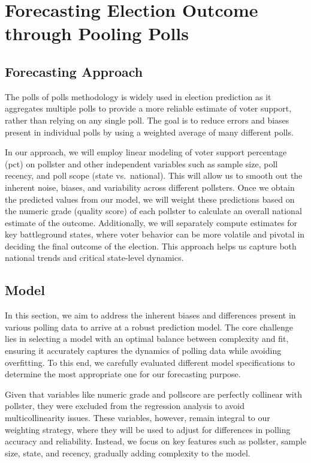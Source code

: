 \documentclass[
  letterpaper,
  DIV=11,
  numbers=noendperiod]{scrartcl}
\begin{document}
\hypertarget{sec-model}{%
\section{Forecasting Election Outcome through Pooling
Polls}\label{sec-model}}

\hypertarget{forecasting-approach}{%
\subsection{Forecasting Approach}\label{forecasting-approach}}

The polls of polls methodology is widely used in election prediction as
it aggregates multiple polls to provide a more reliable estimate of
voter support, rather than relying on any single poll. The goal is to
reduce errors and biases present in individual polls by using a weighted
average of many different polls.

In our approach, we will employ linear modeling of voter support
percentage (pct) on pollster and other independent variables such as
sample size, poll recency, and poll scope (state vs.~national). This
will allow us to smooth out the inherent noise, biases, and variability
across different pollsters. Once we obtain the predicted values from our
model, we will weight these predictions based on the numeric grade
(quality score) of each pollster to calculate an overall national
estimate of the outcome. Additionally, we will separately compute
estimates for key battleground states, where voter behavior can be more
volatile and pivotal in deciding the final outcome of the election. This
approach helps us capture both national trends and critical state-level
dynamics.

\hypertarget{model}{%
\subsection{Model}\label{model}}

In this section, we aim to address the inherent biases and differences
present in various polling data to arrive at a robust prediction model.
The core challenge lies in selecting a model with an optimal balance
between complexity and fit, ensuring it accurately captures the dynamics
of polling data while avoiding overfitting. To this end, we carefully
evaluated different model specifications to determine the most
appropriate one for our forecasting purpose.

Given that variables like numeric grade and pollscore are perfectly
collinear with pollster, they were excluded from the regression analysis
to avoid multicollinearity issues. These variables, however, remain
integral to our weighting strategy, where they will be used to adjust
for differences in polling accuracy and reliability. Instead, we focus
on key features such as pollster, sample size, state, and recency,
gradually adding complexity to the model.
\end{document}

